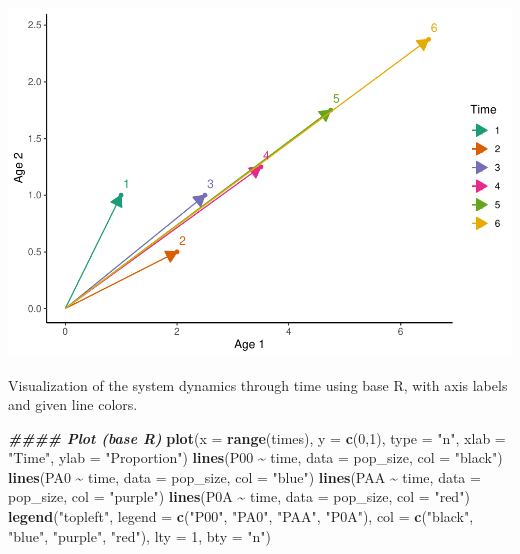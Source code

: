 \documentclass[
]{book}
\newenvironment{Shaded}{\begin{snugshade}}{\end{snugshade}}
\newcommand{\AttributeTok}[1]{\textcolor[rgb]{0.13,0.29,0.53}{#1}}
\newcommand{\DecValTok}[1]{\textcolor[rgb]{0.00,0.00,0.81}{#1}}
\newcommand{\DocumentationTok}[1]{\textcolor[rgb]{0.56,0.35,0.01}{\textbf{\textit{#1}}}}
\newcommand{\FunctionTok}[1]{\textcolor[rgb]{0.13,0.29,0.53}{\textbf{#1}}}
\newcommand{\NormalTok}[1]{#1}
\newcommand{\SpecialCharTok}[1]{\textcolor[rgb]{0.81,0.36,0.00}{\textbf{#1}}}
\newcommand{\StringTok}[1]{\textcolor[rgb]{0.31,0.60,0.02}{#1}}
\begin{document}
\includegraphics{bookdown-demo_files/figure-latex/unnamed-chunk-22-1.pdf}

Visualization of the system dynamics through time using base R, with axis labels and given line colors.

\begin{Shaded}
\begin{Highlighting}[]
\DocumentationTok{\#\#\#\# Plot (base R)}
\FunctionTok{plot}\NormalTok{(}\AttributeTok{x =} \FunctionTok{range}\NormalTok{(times), }\AttributeTok{y =} \FunctionTok{c}\NormalTok{(}\DecValTok{0}\NormalTok{,}\DecValTok{1}\NormalTok{), }\AttributeTok{type =} \StringTok{"n"}\NormalTok{, }\AttributeTok{xlab =} \StringTok{"Time"}\NormalTok{, }\AttributeTok{ylab =} \StringTok{"Proportion"}\NormalTok{)}
\FunctionTok{lines}\NormalTok{(P00 }\SpecialCharTok{\textasciitilde{}}\NormalTok{ time, }\AttributeTok{data =}\NormalTok{ pop\_size, }\AttributeTok{col =} \StringTok{"black"}\NormalTok{)}
\FunctionTok{lines}\NormalTok{(PA0 }\SpecialCharTok{\textasciitilde{}}\NormalTok{ time, }\AttributeTok{data =}\NormalTok{ pop\_size, }\AttributeTok{col =} \StringTok{"blue"}\NormalTok{)}
\FunctionTok{lines}\NormalTok{(PAA }\SpecialCharTok{\textasciitilde{}}\NormalTok{ time, }\AttributeTok{data =}\NormalTok{ pop\_size, }\AttributeTok{col =} \StringTok{"purple"}\NormalTok{)}
\FunctionTok{lines}\NormalTok{(P0A }\SpecialCharTok{\textasciitilde{}}\NormalTok{ time, }\AttributeTok{data =}\NormalTok{ pop\_size, }\AttributeTok{col =} \StringTok{"red"}\NormalTok{)}
\FunctionTok{legend}\NormalTok{(}\StringTok{"topleft"}\NormalTok{, }
       \AttributeTok{legend =} \FunctionTok{c}\NormalTok{(}\StringTok{"P00"}\NormalTok{, }\StringTok{"PA0"}\NormalTok{, }\StringTok{"PAA"}\NormalTok{, }\StringTok{"P0A"}\NormalTok{), }
       \AttributeTok{col =} \FunctionTok{c}\NormalTok{(}\StringTok{"black"}\NormalTok{, }\StringTok{"blue"}\NormalTok{, }\StringTok{"purple"}\NormalTok{, }\StringTok{"red"}\NormalTok{), }\AttributeTok{lty =} \DecValTok{1}\NormalTok{, }\AttributeTok{bty =} \StringTok{"n"}\NormalTok{)}
\end{Highlighting}
\end{Shaded}
\end{document}
